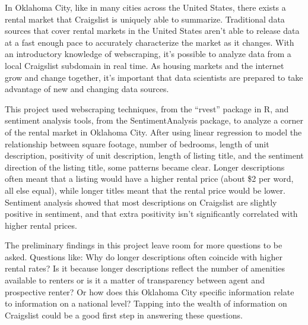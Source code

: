 \documentclass[12pt,english]{article}
\begin{document}
In Oklahoma City, like in many cities across the United States, there exists a rental market that Craigslist is uniquely able to summarize. Traditional data sources that cover rental markets in the United States aren’t able to release data at a fast enough pace to accurately characterize the market as it changes. With an introductory knowledge of webscraping, it’s possible to analyze data from a local Craigslist subdomain in real time. As housing markets and the internet grow and change together, it’s important that data scientists are prepared to take advantage of new and changing data sources. 

This project used webscraping techniques, from the “rvest” package in R, and sentiment analysis tools, from the SentimentAnalysis package, to analyze a corner of the rental market in Oklahoma City. After using linear regression to model the relationship between square footage, number of bedrooms, length of unit description, positivity of unit description, length of listing title,  and the sentiment direction of the listing title, some patterns became clear. Longer descriptions often meant that a listing would have a higher rental price (about \$2 per word, all else equal), while longer titles meant that the rental price would be lower. Sentiment analysis showed that most descriptions on Craigslist are slightly positive in sentiment, and that extra positivity isn’t significantly correlated with higher rental prices. 

The preliminary findings in this project leave room for more questions to be asked. Questions like: Why do longer descriptions often coincide with higher rental rates? Is it because longer descriptions reflect the number of amenities available to renters or is it a matter of transparency between agent and prospective renter? Or how does this Oklahoma City specific information relate to information on a national level? Tapping into the wealth of information on Craigslist could be a good first step in answering these questions.


\vfill
\pagebreak{}
\begin{spacing}{1.0}


\end{spacing}

\vfill
\pagebreak{}
\clearpage

\end{document}
